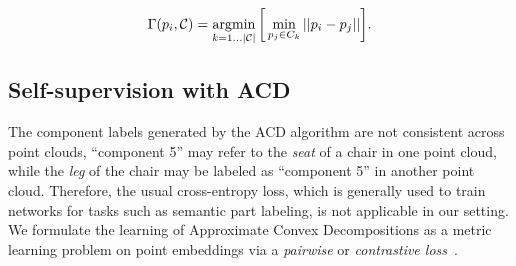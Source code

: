 \begin{equation}
    \Gamma(p_i, \mathcal{C}) = \operatorname*{argmin}_{k = 1 \dots |\mathcal{C}|} \bigg[ \min_{p_j \in C_k} || p_i - p_j ||  \bigg].
\end{equation}



%    




\subsection{Self-supervision with ACD}
 The component labels generated by the ACD algorithm are not consistent across point clouds, 
 \ie ``component 5'' may refer to the \textit{seat} of a chair in one point cloud, 
 while the \textit{leg} of the chair may be labeled as ``component 5'' in another point cloud. 
 Therefore, the usual cross-entropy loss, which is generally used to train networks for tasks such as semantic part labeling, 
 is not applicable in our setting. We formulate the learning of Approximate Convex Decompositions 
 as a metric learning problem on point embeddings via a \textit{pairwise} or \textit{contrastive loss}~\cite{hadsell2006dimensionality}.

